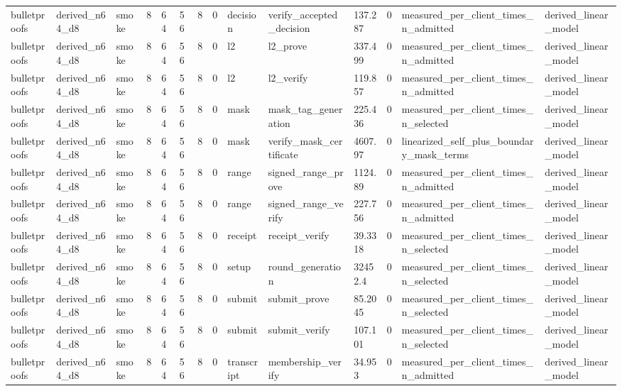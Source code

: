 \begin{table}[t]
\begin{tabular}{llllllllllllll}
bulletproofs & derived\_n64\_d8 & smoke & 8 & 64 & 56 & 8 & 0 & decision & verify\_accepted\_decision & 137.287 & 0 & measured\_per\_client\_times\_n\_admitted & derived\_linear\_model \\
bulletproofs & derived\_n64\_d8 & smoke & 8 & 64 & 56 & 8 & 0 & l2 & l2\_prove & 337.499 & 0 & measured\_per\_client\_times\_n\_admitted & derived\_linear\_model \\
bulletproofs & derived\_n64\_d8 & smoke & 8 & 64 & 56 & 8 & 0 & l2 & l2\_verify & 119.857 & 0 & measured\_per\_client\_times\_n\_admitted & derived\_linear\_model \\
bulletproofs & derived\_n64\_d8 & smoke & 8 & 64 & 56 & 8 & 0 & mask & mask\_tag\_generation & 225.436 & 0 & measured\_per\_client\_times\_n\_selected & derived\_linear\_model \\
bulletproofs & derived\_n64\_d8 & smoke & 8 & 64 & 56 & 8 & 0 & mask & verify\_mask\_certificate & 4607.97 & 0 & linearized\_self\_plus\_boundary\_mask\_terms & derived\_linear\_model \\
bulletproofs & derived\_n64\_d8 & smoke & 8 & 64 & 56 & 8 & 0 & range & signed\_range\_prove & 1124.89 & 0 & measured\_per\_client\_times\_n\_admitted & derived\_linear\_model \\
bulletproofs & derived\_n64\_d8 & smoke & 8 & 64 & 56 & 8 & 0 & range & signed\_range\_verify & 227.756 & 0 & measured\_per\_client\_times\_n\_admitted & derived\_linear\_model \\
bulletproofs & derived\_n64\_d8 & smoke & 8 & 64 & 56 & 8 & 0 & receipt & receipt\_verify & 39.3318 & 0 & measured\_per\_client\_times\_n\_selected & derived\_linear\_model \\
bulletproofs & derived\_n64\_d8 & smoke & 8 & 64 & 56 & 8 & 0 & setup & round\_generation & 32452.4 & 0 & measured\_per\_client\_times\_n\_selected & derived\_linear\_model \\
bulletproofs & derived\_n64\_d8 & smoke & 8 & 64 & 56 & 8 & 0 & submit & submit\_prove & 85.2045 & 0 & measured\_per\_client\_times\_n\_selected & derived\_linear\_model \\
bulletproofs & derived\_n64\_d8 & smoke & 8 & 64 & 56 & 8 & 0 & submit & submit\_verify & 107.101 & 0 & measured\_per\_client\_times\_n\_selected & derived\_linear\_model \\
bulletproofs & derived\_n64\_d8 & smoke & 8 & 64 & 56 & 8 & 0 & transcript & membership\_verify & 34.953 & 0 & measured\_per\_client\_times\_n\_admitted & derived\_linear\_model \\

\end{tabular}
\end{table}
